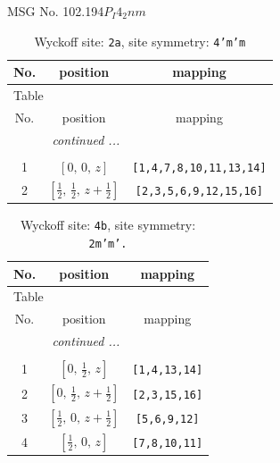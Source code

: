 \documentclass[fleqn,8pt]{jsarticle}
\begin{document}
\setcounter{MaxMatrixCols}{32}

\renewcommand{\tablename}{Table~}
\renewcommand{\figurename}{Figure~}
\begin{center}
\LARGE
MSG No. 102.194\quad$P_{I}4_{2}nm$
\end{center}
\renewcommand{\arraystretch}{1.2}
\begin{longtable}{ccc}
\caption{Wyckoff site: {\tt 2a}, site symmetry: {\tt 4'm'm}}
 \\
 \hline \hline
No. & position & mapping \\ \hline \endfirsthead

\multicolumn{2}{l}{\tablename\ \thetable{}} \\
 \hline \hline
No. & position & mapping \\ \hline \endhead

 \hline \hline
\multicolumn{2}{r}{\footnotesize\it continued ...} \\ \endfoot

 \hline \hline
\multicolumn{2}{r}{} \\ \endlastfoot

1 & $\left[ 0,\, 0,\, z \right]$ & {\tt [1,4,7,8,10,11,13,14]} \\ \hline
2 & $\left[ \frac{1}{2},\, \frac{1}{2},\, z + \frac{1}{2} \right]$ & {\tt [2,3,5,6,9,12,15,16]} \\
\end{longtable}
\renewcommand{\arraystretch}{1.2}
\begin{longtable}{ccc}
\caption{Wyckoff site: {\tt 4b}, site symmetry: {\tt 2m'm'.}}
 \\
 \hline \hline
No. & position & mapping \\ \hline \endfirsthead

\multicolumn{2}{l}{\tablename\ \thetable{}} \\
 \hline \hline
No. & position & mapping \\ \hline \endhead

 \hline \hline
\multicolumn{2}{r}{\footnotesize\it continued ...} \\ \endfoot

 \hline \hline
\multicolumn{2}{r}{} \\ \endlastfoot

1 & $\left[ 0,\, \frac{1}{2},\, z \right]$ & {\tt [1,4,13,14]} \\ \hline
2 & $\left[ 0,\, \frac{1}{2},\, z + \frac{1}{2} \right]$ & {\tt [2,3,15,16]} \\ \hline
3 & $\left[ \frac{1}{2},\, 0,\, z + \frac{1}{2} \right]$ & {\tt [5,6,9,12]} \\ \hline
4 & $\left[ \frac{1}{2},\, 0,\, z \right]$ & {\tt [7,8,10,11]} \\
\end{longtable}
\end{document}
